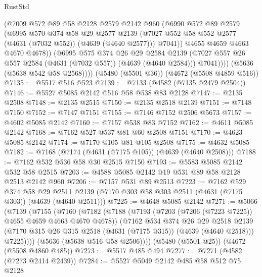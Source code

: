 \begin{lexlean}{RustStd}
\begin{coremodule}
                (@7009
                  @572
                  @89
                  @58
                  @2128
                  @2579
                  @2142
                  @960
                  (@6990
                    @572
                    @89
                    @2579
                    (@6995
                      @570
                      @374
                      @58
                      @29
                      @2577
                      @2139
                      (@7027 @552 @58 @552 @2577 (@4631 (@7032 @552)) (@4639 (@4640 @2577)))
                      @7041))
                  @4655
                  @4659
                  @4663
                  @4670
                  @4678))
              (@6995
                @575
                @374
                @26
                @29
                @2584
                @2139
                (@7027 @557 @26 @557 @2584 (@4631 (@7032 @557)) (@4639 (@4640 @2584)))
                @7041))))
        (@5636 (@5638 @542 @58 @2568))))
    (@5480 (@5501 @36))
    (@4672 (@5508 @4859 @516))
@7135 := @5517 @516 @523
@7139 := @7133 (@4582 (@7135 @2479 @2504))
@7146 := @5527 @5085 @2142 @516 @58 @538 @83 @2128
@7147 := @2135 @2508
@7148 := @2135 @2515
@7150 := @2135 @2518 @2139
@7151 := @7148 @7150
@7152 := @7147 @7151
@7155 := @7146 @7152 @2506 @5673
@7157 := @4602 @5085 @2142
@7160 := @7157 @538 @83 @7152
@7162 := @4611 @5085 @2142
@7168 := @7162 @527 @537 @81 @60 @2508 @7151
@7170 := @4623 @5085 @2142
@7174 := @7170 @105 @81 @105 @2508
@7175 := @4632 @5085
@7182 := @7168 (@7174 (@4631 (@7175 @105)) (@4639 (@4640 @2508)))
@7188 := @7162 @532 @536 @58 @30 @2515 @7150
@7193 := @5583 @5085 @2142 @532 @58 @2515
@7203 := @4588 @5085 @2142 @19 @531 @89 @58 @2128 @2513 @2142 @960
@7206 := @7157 @531 @89 @2513
@7223 := @7162
    @529
    @374
    @58
    @29
    @2511
    @2139
    (@7170 @303 @58 @303 @2511 (@4631 (@7175 @303)) (@4639 (@4640 @2511)))
@7225 := @4648 @5085 @2142
@7271 := @5066
    (@7139
      (@7155
        (@7160
          (@7182
            (@7188
              (@7193 (@7203 (@7206 (@7223 @7225)) @4655 @4659 @4663 @4670 @4678))
              (@7162
                @534
                @374
                @26
                @29
                @2518
                @2139
                (@7170 @315 @26 @315 @2518 (@4631 (@7175 @315)) (@4639 (@4640 @2518)))
                @7225))))
        (@5636 (@5638 @516 @58 @2506))))
    (@5480 (@5501 @25))
    (@4672 (@5508 @4860 @485))
@7273 := @5517 @485 @494
@7277 := @7271 (@4582 (@7273 @2414 @2439))
@7284 := @5527 @5049 @2142 @485 @58 @512 @75 @2128

\end{coremodule}
\end{lexlean}

